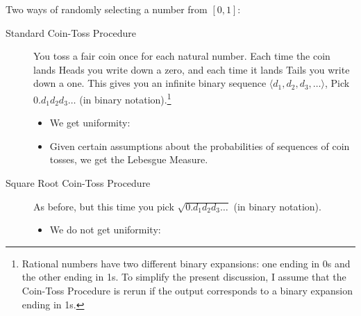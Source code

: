 \documentclass[12pt]{extarticle}
\begin{document}
Two ways of randomly selecting a number from $[0,1]$:
\begin{description}


\item[Standard Coin-Toss Procedure]
You toss a fair coin once for each natural number. Each time the coin lands Heads you write down a zero, and each time it lands Tails you write down a one. This gives you an infinite binary sequence $\langle d_1,d_2,d_3,\ldots\rangle$, Pick $0.d_1d_2d_3\ldots$ (in binary notation).\footnote{Rational numbers have two different binary expansions: one ending in 0s and the other ending in 1s. To simplify the present discussion, I assume that the Coin-Toss Procedure is rerun if the output corresponds to a binary expansion ending in 1s.}

\begin{itemize}
\item We get uniformity:
\vspace{7mm}
\begin{center}
\end{center}
\item Given certain assumptions about the probabilities of sequences of coin tosses, we get the Lebesgue Measure.


\end{itemize}


\item[Square Root Coin-Toss Procedure]
As before, but this time you pick $\sqrt{0.d_1d_2d_3\ldots}$ (in binary notation). 

\begin{itemize}

\item We do not get uniformity:



\vspace{7mm}
\begin{center}
\end{center}

\end{itemize}

\end{description}
\end{document}
